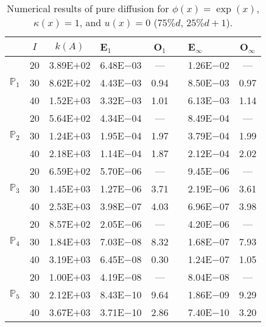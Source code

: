 \begin{table}[H]
\centering
\caption{Numerical results of pure diffusion for $\phi(x)=\exp(x)$, $\kappa(x)=1$, and $u(x)=0$ ($75\%d,\,25\%d+1$).}
\begin{tabular}{@{}l c c l c c l c@{}}
\toprule
 & $I$ & $k(A)$ & E$_1$ & O$_1$ && E$_{\infty}$ & O$_{\infty}$\\
\midrule
\multirow{3}{*}{$\mathbb{P}_{1}$}
 & 20 & 3.89E$+$02 & 6.48E$-$03 & --- && 1.26E$-$02 & ---\\
 & 30 & 8.62E$+$02 & 4.43E$-$03 & 0.94 && 8.50E$-$03 & 0.97\\
 & 40 & 1.52E$+$03 & 3.32E$-$03 & 1.01 && 6.13E$-$03 & 1.14\\
\midrule
\multirow{3}{*}{$\mathbb{P}_{2}$}
 & 20 & 5.64E$+$02 & 4.34E$-$04 & --- && 8.49E$-$04 & ---\\
 & 30 & 1.24E$+$03 & 1.95E$-$04 & 1.97 && 3.79E$-$04 & 1.99\\
 & 40 & 2.18E$+$03 & 1.14E$-$04 & 1.87 && 2.12E$-$04 & 2.02\\
\midrule
\multirow{3}{*}{$\mathbb{P}_{3}$}
 & 20 & 6.59E$+$02 & 5.70E$-$06 & --- && 9.45E$-$06 & ---\\
 & 30 & 1.45E$+$03 & 1.27E$-$06 & 3.71 && 2.19E$-$06 & 3.61\\
 & 40 & 2.53E$+$03 & 3.98E$-$07 & 4.03 && 6.96E$-$07 & 3.98\\
\midrule
\multirow{3}{*}{$\mathbb{P}_{4}$}
 & 20 & 8.57E$+$02 & 2.05E$-$06 & --- && 4.20E$-$06 & ---\\
 & 30 & 1.84E$+$03 & 7.03E$-$08 & 8.32 && 1.68E$-$07 & 7.93\\
 & 40 & 3.19E$+$03 & 6.45E$-$08 & 0.30 && 1.24E$-$07 & 1.05\\
\midrule
\multirow{3}{*}{$\mathbb{P}_{5}$}
 & 20 & 1.00E$+$03 & 4.19E$-$08 & --- && 8.04E$-$08 & ---\\
 & 30 & 2.12E$+$03 & 8.43E$-$10 & 9.64 && 1.86E$-$09 & 9.29\\
 & 40 & 3.67E$+$03 & 3.71E$-$10 & 2.86 && 7.40E$-$10 & 3.20\\
\bottomrule
\end{tabular}
\end{table}
